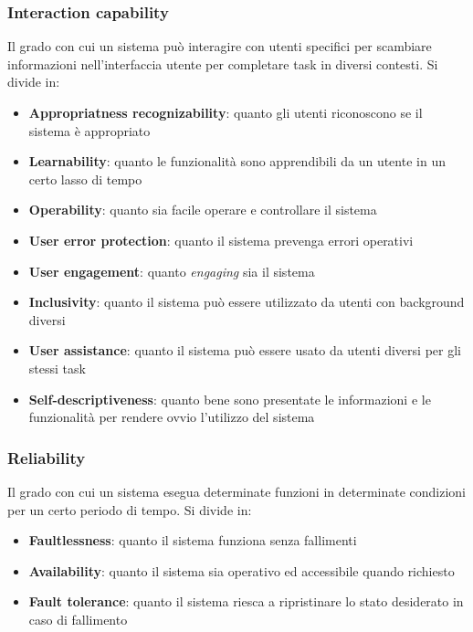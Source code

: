 \subsubsection{Interaction capability}
Il grado con cui un sistema può interagire con utenti specifici per scambiare informazioni nell'interfaccia utente per completare task in diversi contesti. Si divide in:
\begin{itemize}
	\item \textbf{Appropriatness recognizability}: quanto gli utenti riconoscono se il sistema è appropriato
	\item \textbf{Learnability}: quanto le funzionalità sono apprendibili da un utente in un certo lasso di tempo
	\item \textbf{Operability}: quanto sia facile operare e controllare il sistema
	\item \textbf{User error protection}: quanto il sistema prevenga errori operativi
	\item \textbf{User engagement}: quanto \textit{engaging} sia il sistema
	\item \textbf{Inclusivity}: quanto il sistema può essere utilizzato da utenti con background diversi
	\item \textbf{User assistance}: quanto il sistema può essere usato da utenti diversi per gli stessi task
	\item \textbf{Self-descriptiveness}: quanto bene sono presentate le informazioni e le funzionalità per rendere ovvio l'utilizzo del sistema
\end{itemize}

\subsubsection{Reliability}
Il grado con cui un sistema esegua determinate funzioni in determinate condizioni per un certo periodo di tempo. Si divide in:
\begin{itemize}
	\item \textbf{Faultlessness}: quanto il sistema funziona senza fallimenti
	\item \textbf{Availability}: quanto il sistema sia operativo ed accessibile quando richiesto
	\item \textbf{Fault tolerance}: quanto il sistema riesca a ripristinare lo stato desiderato in caso di fallimento
\end{itemize}


